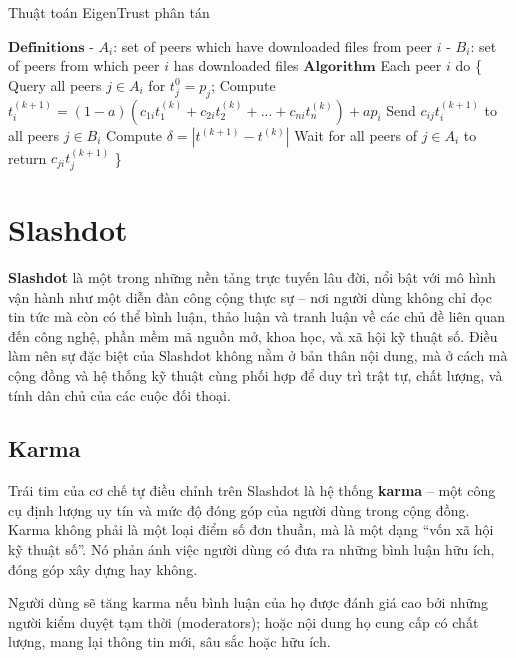 \begin{algorithm}
  \caption{Thuật toán EigenTrust phân tán}
  \label{alg:distributed-eigentrust-algorithm}
  \begin{algorithmic}
    \State $\textbf{Definitions}$
    \State \hspace{1em}- $A_i$: set of peers which have downloaded files from peer $i$
    \State \hspace{1em}- $B_i$: set of peers from which peer $i$ has downloaded files
    \State $\textbf{Algorithm}$
    \State Each peer $i$ do \{
    \State Query all peers $j \in A_i$ for $t_j^{0} = p_j$;
    \Repeat
    \State Compute $t_i^{(k+1)} = (1 - a)(c_{1i}t_1^{(k)} + c_{2i}t_2^{(k)} + ... + c_{ni}t_n^{(k)}) + ap_i$
    \State Send $c_{ij}t_i^{(k+1)}$ to all peers $j \in B_i$
    \State Compute $\delta = | t^{(k+1)} - t^{(k)} |$
    \State Wait for all peers of $j \in A_i$ to return $c_{ji}t_j^{(k+1)}$
    \Until{$\delta < \epsilon$}
    \State \}
  \end{algorithmic}
\end{algorithm}

\section{Slashdot}

\textbf{Slashdot} \cite{slashdot-web} là một trong những nền tảng trực tuyến lâu đời, nổi bật với mô hình vận hành như một diễn đàn công cộng thực sự -- nơi người dùng không chỉ đọc tin tức mà còn có thể bình luận, 
thảo luận và tranh luận về các chủ đề liên quan đến công nghệ, phần mềm mã nguồn mở, khoa học, và xã hội kỹ thuật số. 
Điều làm nên sự đặc biệt của Slashdot không nằm ở bản thân nội dung, mà ở cách mà cộng đồng và hệ thống kỹ thuật cùng phối hợp để duy trì trật tự, chất lượng, và tính dân chủ của các cuộc đối thoại.

\subsection{Karma}

Trái tim của cơ chế tự điều chỉnh trên Slashdot là hệ thống \textbf{karma} \cite{mechanisms-of-website-slashdot} -- một công cụ định lượng uy tín và mức độ đóng góp của người dùng trong cộng đồng.
Karma không phải là một loại điểm số đơn thuần, mà là một dạng ``vốn xã hội kỹ thuật số''. Nó phản ánh việc người dùng có đưa ra những bình luận hữu ích, đóng góp xây dựng hay không.

Người dùng sẽ tăng karma nếu bình luận của họ được đánh giá cao bởi những người kiểm duyệt tạm thời (moderators); hoặc nội dung họ cung cấp có chất lượng, mang lại thông tin mới, sâu sắc hoặc hữu ích.

